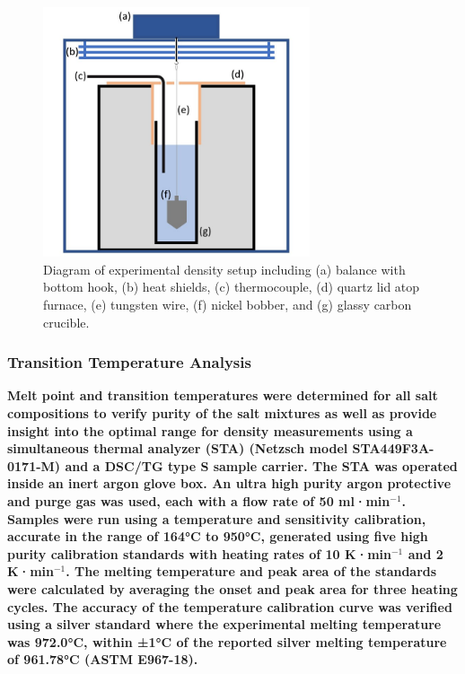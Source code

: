 \documentclass[review]{elsarticle}
\providecommand{\DIFaddtex}[1]{{\bf #1}} %
\providecommand{\DIFaddbegin}{\protect\color{blue}} %
\providecommand{\DIFaddbeginFL}{} %
\providecommand{\DIFaddendFL}{} %
\providecommand{\DIFdelbeginFL}{} %
\providecommand{\DIFdelendFL}{} %
\providecommand{\DIFadd}[1]{\texorpdfstring{\DIFaddtex{#1}}{#1}} %
\newcommand{\DIFscaledelfig}{0.5}
\newlength{\DIFdelgraphicswidth} %
\newlength{\DIFdelgraphicsheight} %
\newcommand{\DIFaddincludegraphics}[2][]{{\color{blue}\fbox{\DIFOincludegraphics[#1]{#2}}}} %
\newcommand{\DIFdelincludegraphics}[2][]{%
\sbox{\DIFdelgraphicsbox}{\DIFOincludegraphics[#1]{#2}}%
\settoboxwidth{\DIFdelgraphicswidth}{\DIFdelgraphicsbox} %
\settoboxtotalheight{\DIFdelgraphicsheight}{\DIFdelgraphicsbox} %
\scalebox{\DIFscaledelfig}{%
\parbox[b]{\DIFdelgraphicswidth}{\usebox{\DIFdelgraphicsbox}\\[-\baselineskip] \rule{\DIFdelgraphicswidth}{0em}}\llap{\resizebox{\DIFdelgraphicswidth}{\DIFdelgraphicsheight}{%
\setlength{\unitlength}{\DIFdelgraphicswidth}%
\begin{picture}(1,1)%
\thicklines\linethickness{2pt} %
{\color[rgb]{1,0,0}\put(0,0){\framebox(1,1){}}}%
{\color[rgb]{1,0,0}\put(0,0){\line( 1,1){1}}}%
{\color[rgb]{1,0,0}\put(0,1){\line(1,-1){1}}}%
\end{picture}%
}\hspace*{3pt}}} %
} %
\DeclareRobustCommand{\DIFaddbegin}{\DIFOaddbegin \let\includegraphics\DIFaddincludegraphics} %
\DeclareRobustCommand{\DIFaddbeginFL}{\DIFOaddbeginFL \let\includegraphics\DIFaddincludegraphics} %
\DeclareRobustCommand{\DIFaddendFL}{\DIFOaddendFL \let\includegraphics\DIFOincludegraphics} %
\DeclareRobustCommand{\DIFdelbeginFL}{\DIFOdelbeginFL \let\includegraphics\DIFdelincludegraphics} %
\DeclareRobustCommand{\DIFdelendFL}{\DIFOaddendFL \let\includegraphics\DIFOincludegraphics} %
\begin{document}
\begin{figure}[h]
 \centering
 \DIFdelbeginFL %
\DIFdelendFL \DIFaddbeginFL \includegraphics[width=0.7\textwidth]{images/Density_exp_setup.jpg} 
 \DIFaddendFL \caption{Diagram of experimental density setup including (a) balance with bottom hook, (b) heat shields, (c) thermocouple, (d) quartz lid atop furnace, (e) tungsten wire, (f) nickel bobber, and (g) glassy carbon crucible.}
 \label{fig:dens}
\end{figure} 

\DIFaddbegin \subsubsection{\DIFadd{Transition Temperature Analysis}}

\DIFadd{Melt point and transition temperatures were determined for all salt compositions to verify purity of the salt mixtures as well as provide insight into the optimal range for density measurements using a simultaneous thermal analyzer (STA) (Netzsch model STA449F3A-0171-M) and a DSC/TG type S sample carrier. The STA was operated inside an inert argon glove box. An ultra high purity argon protective and purge gas was used, each with a flow rate of 50 ml·min$^{-1}$. Samples were run using a temperature and sensitivity calibration, accurate in the range of 164°C to 950°C, generated using five high purity calibration standards with heating rates of 10 K·min$^{-1}$ and 2 K·min$^{-1}$. The melting temperature and peak area of the standards were calculated by averaging the onset and peak area for three heating cycles. The accuracy of the temperature calibration curve was verified using a silver standard where the experimental melting temperature was 972.0°C, within ±1°C of the reported silver melting temperature of 961.78°C (ASTM E967-18). 
}
\end{document}

